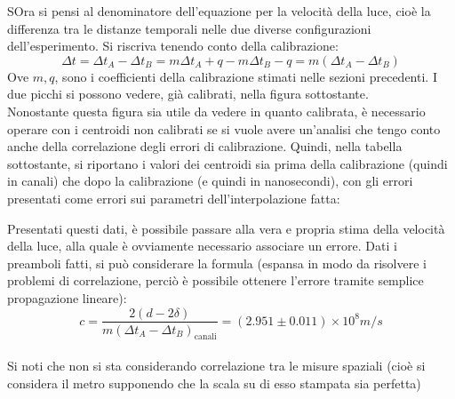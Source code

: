 SOra si pensi al denominatore dell'equazione per la velocità della luce, cioè la differenza tra le distanze temporali nelle due diverse configurazioni dell'esperimento.
Si riscriva tenendo conto della calibrazione:
$$
  \Delta t = \Delta t_A - \Delta t_B = m\Delta t_A + q - m\Delta t_B - q = m (\Delta t_A - \Delta t_B) 
$$
Ove $m,q$, sono i coefficienti della calibrazione stimati nelle sezioni precedenti. I due picchi si possono vedere, già calibrati, nella figura sottostante.\\

Nonostante questa figura sia utile da vedere in quanto calibrata, è necessario operare con i centroidi non calibrati se si vuole avere un'analisi che tengo conto anche
della correlazione degli errori di calibrazione. Quindi, nella tabella sottostante, si riportano i valori dei centroidi sia prima della calibrazione (quindi in canali)
che dopo la calibrazione (e quindi in nanosecondi), con gli errori presentati come errori sui parametri dell'interpolazione fatta:



Presentati questi dati, è possibile passare alla vera e propria stima della velocità della luce, alla quale è ovviamente necessario associare un errore. Dati i preamboli
fatti, si può considerare la formula (espansa in modo da risolvere i problemi di correlazione, perciò è possibile ottenere l'errore tramite semplice propagazione
lineare):
$$
  c = \frac{2 ( d - 2 \delta)}{m (\Delta t_A - \Delta t_B)_\text{canali}} = (2.951 \pm 0.011) \times 10^8 m/s 
$$
\\

Si noti che non si sta considerando correlazione tra le misure spaziali (cioè si considera il metro supponendo che la scala su di esso stampata sia perfetta)


